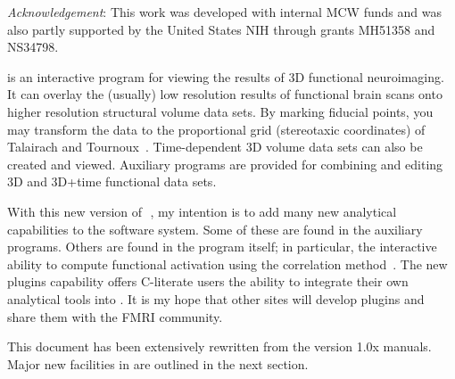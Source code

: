 \vspace{1.1ex}
\noindent
{\it Acknowledgement\/}:
This work was developed with internal MCW funds
and was also partly supported by the United States NIH through 
grants MH51358 and NS34798.


\newpage
\setlength{\columnsep}{1.1em}
\setlength{\columnseprule}{0.5pt}
\onecolumn

\newpage
{}
\afnit is an interactive program
for viewing the results of 3D functional neuroimaging.
It can overlay the (usually) low resolution results of functional brain
scans onto higher resolution structural volume data sets.  By marking fiducial
points, you may transform the data to the proportional grid
(stereotaxic coordinates) of Talairach and Tournoux~\cite{Talairach}.
Time-dependent 3D volume data sets can also be created and viewed.
Auxiliary programs are provided for combining and editing 3D and
3D+time functional data sets.

With this new version of \MCW$\!$ \afni, my intention is to add many new
analytical capabilities to the software system.  Some of these are
found in the auxiliary programs.  Others are found in the \afnit program
itself; in particular, the interactive ability to compute functional activation
using the correlation method~\cite{Bandettini}.  The
new plugins capability offers C-literate users the ability
to integrate their own analytical tools into \afni.  It is my hope
that other sites will develop \afnit plugins and share them with
the FMRI community.

This document has been extensively rewritten from the version 1.0x
manuals.  Major new
facilities in \afnit are outlined in the next section.

